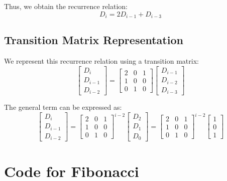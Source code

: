 Thus, we obtain the recurrence relation:
\begin{equation}
    D_i = 2D_{i - 1} + D_{i - 3}
\end{equation}

\subsection{Transition Matrix Representation}

We represent this recurrence relation using a transition matrix:
\[
\begin{bmatrix}
    D_i \\
    D_{i - 1} \\
    D_{i - 2}
\end{bmatrix}
=
\begin{bmatrix}
    2 & 0 & 1 \\
    1 & 0 & 0 \\
    0 & 1 & 0
\end{bmatrix}
\begin{bmatrix}
    D_{i - 1} \\
    D_{i - 2} \\
    D_{i - 3}
\end{bmatrix}
\]

The general term can be expressed as:
\[
\begin{bmatrix}
    D_i \\
    D_{i - 1} \\
    D_{i - 2}
\end{bmatrix}
=
\begin{bmatrix}
    2 & 0 & 1 \\
    1 & 0 & 0 \\
    0 & 1 & 0
\end{bmatrix}^{i - 2}
\begin{bmatrix}
    D_2 \\
    D_1 \\
    D_0
\end{bmatrix}
=
\begin{bmatrix}
    2 & 0 & 1 \\
    1 & 0 & 0 \\
    0 & 1 & 0
\end{bmatrix}^{i - 2}
\begin{bmatrix}
    1 \\
    0 \\
    1
\end{bmatrix}
\]

\section{Code for Fibonacci}
\label{Fibonacci Code}
